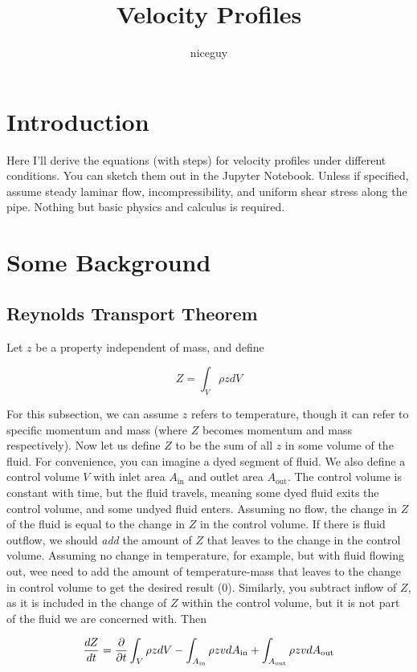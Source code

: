 \documentclass[12pt]{article}
\title{Velocity Profiles}
\author{niceguy}
\begin{document}
\maketitle

\section{Introduction}

Here I'll derive the equations (with steps) for velocity profiles under different conditions. You can sketch them out in the Jupyter Notebook. Unless if specified, assume steady laminar flow, incompressibility, and uniform shear stress along the pipe. Nothing but basic physics and calculus is required.

\section{Some Background}

\subsection{Reynolds Transport Theorem}

Let $z$ be a property independent of mass, and define

$$Z = \int_V \rho z dV$$

For this subsection, we can assume $z$ refers to temperature, though it can refer to specific momentum and mass (where $Z$ becomes momentum and mass respectively). Now let us define $Z$ to be the sum of all $z$ in some volume of the fluid. For convenience, you can imagine a dyed segment of fluid. We also define a control volume $V$ with inlet area $A_{\text{in}}$ and outlet area $A_{\text{out}}$. The control volume is constant with time, but the fluid travels, meaning some dyed fluid exits the control volume, and some undyed fluid enters. Assuming no flow, the change in $Z$ of the fluid is equal to the change in $Z$ in the control volume. If there is fluid outflow, we should \emph{add} the amount of $Z$ that leaves to the change in the control volume. Assuming no change in temperature, for example, but with fluid flowing out, wee need to add the amount of temperature-mass that leaves to the change in control volume to get the desired result (0). Similarly, you subtract inflow of $Z$, as it is included in the change of $Z$ within the control volume, but it is not part of the fluid we are concerned with. Then

$$\frac{dZ}{dt} = \frac{\partial }{\partial t} \int_V \rho z dV - \int_{A_{\text{in}}} \rho zvdA_{\text{in}} + \int_{A_{\text{out}}} \rho zvdA_{\text{out}}$$
\end{document}
